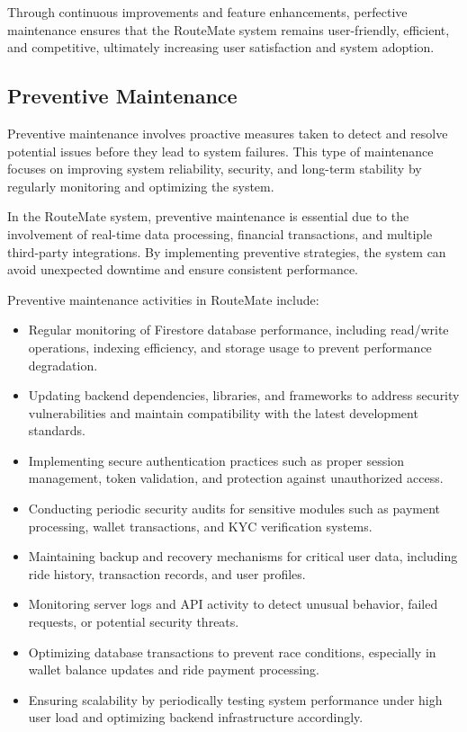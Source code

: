 \documentclass[10pt,a4paper]{report}
\begin{document}
\justify\large Through continuous improvements and feature enhancements, perfective maintenance ensures that the RouteMate system remains user-friendly, efficient, and competitive, ultimately increasing user satisfaction and system adoption.

\subsection{Preventive Maintenance}

\justify\large Preventive maintenance involves proactive measures taken to detect and resolve potential issues before they lead to system failures. This type of maintenance focuses on improving system reliability, security, and long-term stability by regularly monitoring and optimizing the system.

\justify\large In the RouteMate system, preventive maintenance is essential due to the involvement of real-time data processing, financial transactions, and multiple third-party integrations. By implementing preventive strategies, the system can avoid unexpected downtime and ensure consistent performance.

\justify\large Preventive maintenance activities in RouteMate include:

\begin{itemize}

\item Regular monitoring of Firestore database performance, including read/write operations, indexing efficiency, and storage usage to prevent performance degradation.

\item Updating backend dependencies, libraries, and frameworks to address security vulnerabilities and maintain compatibility with the latest development standards.

\item Implementing secure authentication practices such as proper session management, token validation, and protection against unauthorized access.

\item Conducting periodic security audits for sensitive modules such as payment processing, wallet transactions, and KYC verification systems.

\item Maintaining backup and recovery mechanisms for critical user data, including ride history, transaction records, and user profiles.

\item Monitoring server logs and API activity to detect unusual behavior, failed requests, or potential security threats.

\item Optimizing database transactions to prevent race conditions, especially in wallet balance updates and ride payment processing.

\item Ensuring scalability by periodically testing system performance under high user load and optimizing backend infrastructure accordingly.

\end{itemize}
\end{document}
